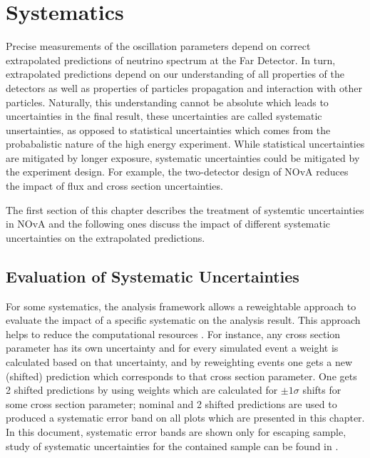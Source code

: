 \chapter{Systematics}
\label{systematic_chapter}

Precise measurements of the oscillation parameters depend on correct extrapolated predictions of neutrino spectrum at 
the Far Detector. In turn, extrapolated predictions depend on our understanding of all properties of the detectors as
well as properties of particles propagation and interaction with other particles. Naturally, this understanding cannot 
be absolute which leads to uncertainties in the final result, these uncertainties are called systematic 
unsertainties, as opposed to statistical uncertainties which comes from the probabalistic nature of the high energy experiment.
While statistical uncertainties are mitigated by longer exposure, systematic uncertainties could be mitigated by the
experiment design. For example, the two-detector design of NOvA reduces the impact of flux and cross section uncertainties.

The first section of this chapter describes the treatment of systemtic uncertainties in NOvA and the following ones
discuss the impact of different systematic uncertainties on the extrapolated predictions. 

\section{Evaluation of Systematic Uncertainties}
For some systematics, the analysis framework allows a reweightable approach to evaluate the impact of a specific systematic
on the analysis result. This approach helps to reduce the computational resources \cite{cafana}. For instance, any cross section 
parameter has its own uncertainty and for every simulated event a weight is calculated based on that uncertainty, and 
by reweighting events one gets a new (shifted) prediction which 
corresponds to that cross section parameter. One gets 2 shifted predictions by using weights which are calculated for 
$\pm 1\sigma$ shifts for some cross section parameter; nominal and 2 shifted predictions are used to produced a 
systematic error band on all plots which are presented in this chapter. In this document, systematic 
error bands are shown only for escaping sample, study of systematic uncertainties for the contained sample can be found in
\cite{Luke}.

